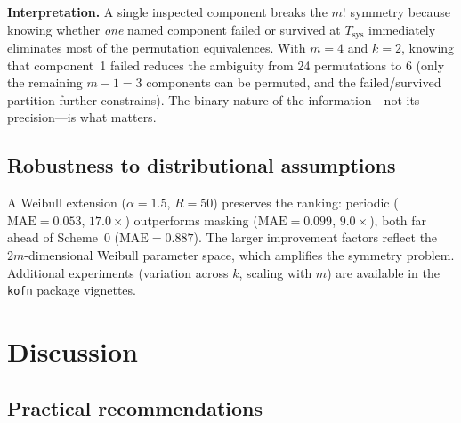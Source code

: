 \documentclass[12pt]{article}
\newcommand{\Tsys}{T_{\mathrm{sys}}}
\newcommand{\MAE}{\mathrm{MAE}}
\begin{document}
\textbf{Interpretation.}  A single inspected component breaks the $m!$
symmetry because knowing whether \emph{one} named component failed or
survived at $\Tsys$ immediately eliminates most of the permutation
equivalences.  With $m = 4$ and $k = 2$, knowing that component~1 failed
reduces the ambiguity from 24 permutations to 6 (only the remaining
$m - 1 = 3$ components can be permuted, and the failed/survived partition
further constrains).  The binary nature of the information---not its
precision---is what matters.

\subsection{Robustness to distributional assumptions}

A Weibull extension ($\alpha = 1.5$, $R = 50$) preserves the ranking:
periodic ($\MAE = 0.053$, $17.0\times$) outperforms masking
($\MAE = 0.099$, $9.0\times$), both far ahead of Scheme~0
($\MAE = 0.887$).  The larger improvement factors reflect the
$2m$-dimensional Weibull parameter space, which amplifies the symmetry
problem.  Additional experiments (variation across $k$, scaling with $m$)
are available in the \texttt{kofn} package vignettes.


\section{Discussion}\label{sec:discussion}

\subsection{Practical recommendations}\label{sec:recommendations}
\end{document}
